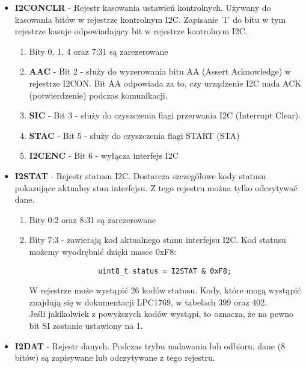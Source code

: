 \begin{itemize}
\begin{enumerate}
        
    \end{enumerate}
    \item \textbf{I2CONCLR} - Rejestr kasowania ustawień kontrolnych. Używany do kasowania bitów w rejestrze kontrolnym I2C. Zapisanie '1' do bitu w tym rejestrze kasuje odpowiadający bit w rejestrze kontrolnym I2C.
    \begin{enumerate}
        \item Bity 0, 1, 4 oraz 7:31 są zarezerowane
        \item \textbf{AAC} - Bit 2 - służy do wyzerowania bitu AA (Assert Acknowledge) w rejestrze I2CON. Bit AA odpowiada za to, czy urządzenie I2C nada ACK (potwierdzenie) podczas komunikacji.
        \item \textbf{SIC} - Bit 3 - służy do czyszczenia flagi przerwania I2C (Interrupt Clear). 
        \item \textbf{STAC} - Bit 5 - służy do czyszczenia flagi START (STA)
        \item \textbf{I2CENC} - Bit 6 - wyłącza interfejs I2C
    \end{enumerate}
    
    \item \textbf{I2STAT} - Rejestr statusu I2C. Dostarcza szczegółowe kody statusu pokazujące aktualny stan interfejsu. Z tego rejestru można tylko odczytywać dane.
    \begin{enumerate}
        \item Bity 0:2 oraz 8:31 są zarezerowane
        \item Bity 7:3 - zawierają kod aktualnego stanu interfejsu I2C.
            Kod statusu możemy wyodrębnić dzięki masce 0xF8:\\
            \begin{verbatim}
                uint8_t status = I2STAT & 0xF8;
            \end{verbatim}

            W rejestrze może wystąpić 26 kodów statusu. Kody, które mogą wystąpić znajdują się w dokumentacji LPC1769, w tabelach 399 oraz 402.\\
            Jeśli jakikolwiek z powyższych kodów wystąpi, to oznacza, że na pewno bit SI zostanie ustawiony na 1.
    \end{enumerate}
    
    
    \item \textbf{I2DAT} - Rejestr danych. Podczas trybu nadawania lub odbioru, dane (8 bitów) są zapisywane lub odczytywane z tego rejestru.   
    

\end{itemize}
